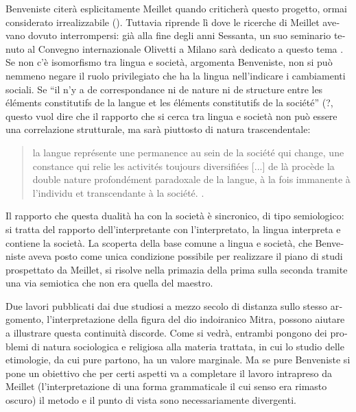 \documentclass[output=paper]{../langscibook}
\begin{document}
\begin{otherlanguage}{italian}
Benveniste citerà esplicitamente Meillet quando criticherà questo progetto, ormai considerato irrealizzabile (\citealt[14--15]{benveniste_problemes_1966}). Tuttavia riprende lì dove le ricerche di Meillet avevano dovuto interrompersi: già alla fine degli anni Sessanta, un suo seminario tenuto al Convegno internazionale Olivetti a Milano sarà dedicato a questo tema \citep{Benveniste1974}. Se non c’è isomorfismo tra lingua e società, argomenta Benveniste, non si può nemmeno negare il ruolo privilegiato che ha la lingua nell’indicare i cambiamenti sociali. Se “il n’y a de correspondance ni de nature ni de structure entre les éléments constitutifs de la langue et les éléments constitutifs de la société” (\citealt[93]{Benveniste1974}?, questo vuol dire che il rapporto che si cerca tra lingua e società non può essere una correlazione strutturale, ma sarà piuttosto di natura trascendentale:

\begin{quote}
    la langue représente une permanence au sein de la société qui change, une constance qui relie les activités toujours diversifiées [...] de là procède la double nature profondément paradoxale de la langue, à la fois immanente à l’individu et transcendante à la société. \citep[65]{Benveniste1974}.
\end{quote}

Il rapporto che questa dualità ha con la società è sincronico, di tipo semiologico: si tratta del rapporto dell’interpretante con l’interpretato, la lingua interpreta e contiene la società. La scoperta della base comune a lingua e società, che Benveniste aveva posto come unica condizione possibile per realizzare il piano di studi prospettato da Meillet, si risolve nella primazia della prima sulla seconda tramite una via semiotica che non era quella del maestro.\footnotemark{}

Due lavori pubblicati dai due studiosi a mezzo secolo di distanza sullo stesso argomento, l’interpretazione della figura del dio indoiranico Mitra, possono aiutare a illustrare questa continuità discorde. Come si vedrà, entrambi pongono dei problemi di natura sociologica e religiosa alla materia trattata, in cui lo studio delle etimologie, da cui pure partono, ha un valore marginale. Ma se pure Benveniste si pone un obiettivo che per certi aspetti va a completare il lavoro intrapreso da Meillet (l’interpretazione di una forma grammaticale il cui senso era rimasto oscuro) il metodo e il punto di vista sono necessariamente divergenti.


\end{otherlanguage}
\end{document}
